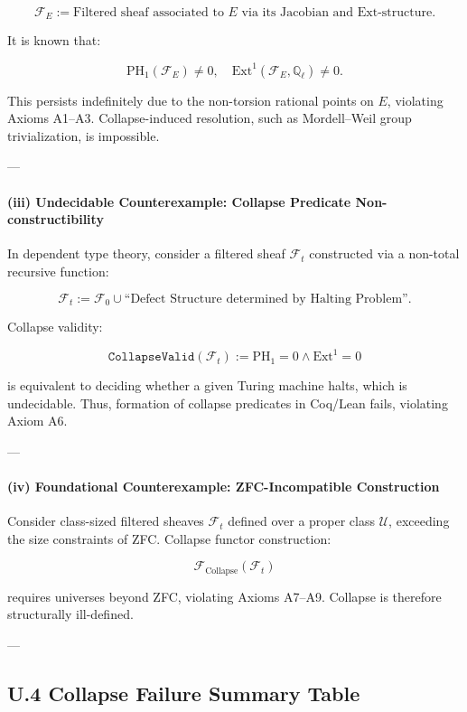 \documentclass[11pt]{article}
\begin{document}
\[
\mathcal{F}_E := \text{Filtered sheaf associated to } E \text{ via its Jacobian and Ext-structure}.
\]

It is known that:

\[
\mathrm{PH}_1(\mathcal{F}_E) \neq 0, \quad \mathrm{Ext}^1(\mathcal{F}_E, \mathbb{Q}_\ell) \neq 0.
\]

This persists indefinitely due to the non-torsion rational points on $E$, violating Axioms A1–A3.  
Collapse-induced resolution, such as Mordell–Weil group trivialization, is impossible.

---

\paragraph{(iii) Undecidable Counterexample: Collapse Predicate Non-constructibility}

In dependent type theory, consider a filtered sheaf $\mathcal{F}_t$ constructed via a non-total recursive function:

\[
\mathcal{F}_t := \mathcal{F}_0 \cup \text{``Defect Structure determined by Halting Problem''}.
\]

Collapse validity:

\[
\texttt{CollapseValid}(\mathcal{F}_t) := \mathrm{PH}_1 = 0 \wedge \mathrm{Ext}^1 = 0
\]

is equivalent to deciding whether a given Turing machine halts, which is undecidable.  
Thus, formation of collapse predicates in Coq/Lean fails, violating Axiom A6.

---

\paragraph{(iv) Foundational Counterexample: ZFC-Incompatible Construction}

Consider class-sized filtered sheaves $\mathcal{F}_t$ defined over a proper class $\mathcal{U}$, exceeding the size constraints of ZFC.  
Collapse functor construction:

\[
\mathcal{F}_{\mathrm{Collapse}}(\mathcal{F}_t)
\]

requires universes beyond ZFC, violating Axioms A7–A9.  
Collapse is therefore structurally ill-defined.

---

\subsection*{U.4 Collapse Failure Summary Table}
\end{document}
